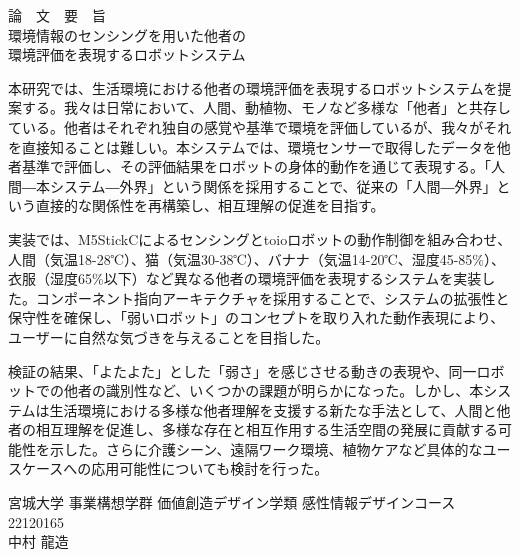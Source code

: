 \begin{center}
  {\Large
    論　文　要　旨\\
    \vspace{2\zh}
    環境情報のセンシングを用いた他者の\\環境評価を表現するロボットシステム\\
    \vspace{2\zh}
  }
\end{center}

本研究では、生活環境における他者の環境評価を表現するロボットシステムを提案する。我々は日常において、人間、動植物、モノなど多様な「他者」と共存している。他者はそれぞれ独自の感覚や基準で環境を評価しているが、我々がそれを直接知ることは難しい。本システムでは、環境センサーで取得したデータを他者基準で評価し、その評価結果をロボットの身体的動作を通じて表現する。「人間―本システム―外界」という関係を採用することで、従来の「人間―外界」という直接的な関係性を再構築し、相互理解の促進を目指す。

実装では、M5StickCによるセンシングとtoioロボットの動作制御を組み合わせ、人間（気温18-28℃）、猫（気温30-38℃）、バナナ（気温14-20℃、湿度45-85\%）、衣服（湿度65\%以下）など異なる他者の環境評価を表現するシステムを実装した。コンポーネント指向アーキテクチャを採用することで、システムの拡張性と保守性を確保し、「弱いロボット」のコンセプトを取り入れた動作表現により、ユーザーに自然な気づきを与えることを目指した。

検証の結果、「よたよた」とした「弱さ」を感じさせる動きの表現や、同一ロボットでの他者の識別性など、いくつかの課題が明らかになった。しかし、本システムは生活環境における多様な他者理解を支援する新たな手法として、人間と他者の相互理解を促進し、多様な存在と相互作用する生活空間の発展に貢献する可能性を示した。さらに介護シーン、遠隔ワーク環境、植物ケアなど具体的なユースケースへの応用可能性についても検討を行った。

\vspace{3\zh}

\begin{flushright}
  宮城大学 事業構想学群 価値創造デザイン学類 感性情報デザインコース\\
  22120165\\ %
  中村 龍造\\ %
\end{flushright}
